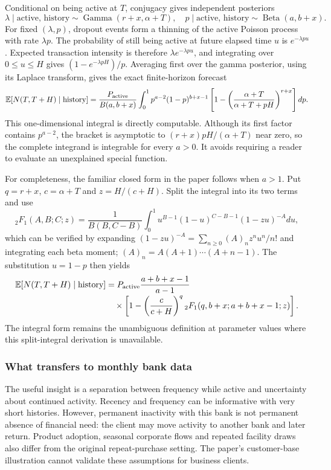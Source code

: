 Conditional on being active at $T$, conjugacy gives independent posteriors
\[
 \lambda\mid\text{active, history}\sim\operatorname{Gamma}(r+x,\alpha+T),
 \quad p\mid\text{active, history}\sim\operatorname{Beta}(a,b+x).
\]
For fixed $(\lambda,p)$, dropout events form a thinning of the active Poisson process with rate $\lambda p$. The probability of still being active at future elapsed time $u$ is $e^{-\lambda pu}$. Expected transaction intensity is therefore $\lambda e^{-\lambda pu}$, and integrating over $0\le u\le H$ gives $(1-e^{-\lambda pH})/p$. Averaging first over the gamma posterior, using its Laplace transform, gives the exact finite-horizon forecast
\begin{equation}
 \mathbb{E}[N(T,T+H)\mid\text{history}]
 =\frac{P_{\rm active}}{B(a,b+x)}
 \int_0^1 p^{a-2}(1-p)^{b+x-1}
 \left[1-\left(\frac{\alpha+T}{\alpha+T+pH}\right)^{r+x}\right]dp.
 \label{eq:bgnbd-forecast}
\end{equation}
This one-dimensional integral is directly computable. Although its first factor contains $p^{a-2}$, the bracket is asymptotic to $(r+x)pH/(\alpha+T)$ near zero, so the complete integrand is integrable for every $a>0$. It avoids requiring a reader to evaluate an unexplained special function.

For completeness, the familiar closed form in the paper follows when $a>1$. Put $q=r+x$, $c=\alpha+T$ and $z=H/(c+H)$. Split the integral into its two terms and use
\[
 {}_2F_1(A,B;C;z)=\frac{1}{B(B,C-B)}
 \int_0^1 u^{B-1}(1-u)^{C-B-1}(1-zu)^{-A}du,
\]
which can be verified by expanding $(1-zu)^{-A}=\sum_{n\ge0}(A)_nz^nu^n/n!$ and integrating each beta moment; $(A)_n=A(A+1)\cdots(A+n-1)$. The substitution $u=1-p$ then yields
\begin{align}
 \mathbb{E}[N(T,T+H)\mid\text{history}]
 &=P_{\rm active}\frac{a+b+x-1}{a-1}\nonumber\\[-2pt]
 &\quad\times\left[1-\left(\frac{c}{c+H}\right)^q
 {}_2F_1(q,b+x;a+b+x-1;z)\right].
 \label{eq:bgnbd-hypergeom}
\end{align}
The integral form remains the unambiguous definition at parameter values where this split-integral derivation is unavailable.

\subsubsection{What transfers to monthly bank data}

The useful insight is a separation between frequency while active and uncertainty about continued activity. Recency and frequency can be informative with very short histories. However, permanent inactivity with this bank is not permanent absence of financial need: the client may move activity to another bank and later return. Product adoption, seasonal corporate flows and repeated facility draws also differ from the original repeat-purchase setting. The paper's customer-base illustration cannot validate these assumptions for business clients.

